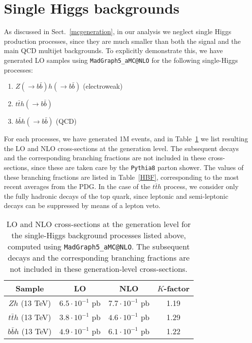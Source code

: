 
\appendix

\section{Single Higgs backgrounds}
\label{app:singlehiggs}

As discussed in Sect.~\ref{mcgeneration},
in our analysis we neglect single Higgs production processes,
since they are much smaller than both the signal and the main
QCD multijet backgrounds.
%
To explicitly demonstrate this, we have generated LO samples
using  {\tt MadGraph5\_aMC@NLO}
for the
following single-Higgs processes:
  \begin{enumerate}
  \item $Z(\to b\bar{b})h(\to b\bar{b})$ (electroweak)
  \item $t\bar{t}h(\to b\bar{b})$
    \item $b\bar{b}h(\to b\bar{b})$ (QCD)
  \end{enumerate}
  For each processes, we have  generated 1M events, and in
 Table~\ref{HK}  we list resulting the
  LO and NLO cross-sections at the generation level.
  The subsequent decays and the
  corresponding branching fractions are not included in these cross-sections,
  since
  these are taken care by the {\tt Pythia8} parton shower.
  The values of these branching fractions 
  are listed in Table~\ref{HBF}, corresponding
  to the  most recent averages from the PDG.
  In the case of the $t\bar{t}h$ process, we
  consider only the fully hadronic decays
  of the top quark, since leptonic and semi-leptonic decays
  can be suppressed
  by means of a lepton veto.
  
  \begin{table}[h]
\begin{center}
\begin{tabular}{|c|c|c|c|}
\hline
Sample & LO & NLO & $K$-factor\\
\hline\hline
$Zh$ (13 TeV) & $6.5 \cdot 10^{-1}$ pb & $ 7.7 \cdot 10^{-1}$ pb & 1.19 \\
$t\bar{t}h$ (13 TeV) & $3.8 \cdot 10^{-1}$ pb & $4.6 \cdot 10^{-1}$ pb & 1.29 \\
$b\bar{b}h$ (13 TeV) &  $4.9 \cdot 10^{-1}$ pb & $6.1 \cdot 10^{-1}$ pb & 1.22 \\
\hline
\end{tabular}
\caption{\small LO and NLO cross-sections at the generation level for the single-Higgs background
  processes listed above, computed using {\tt MadGraph5\_aMC@NLO}.
  The subsequent decays and the corresponding branching fractions are not included in these generation-level cross-sections. \label{HK}
}
\end{center}
  \end{table}%

